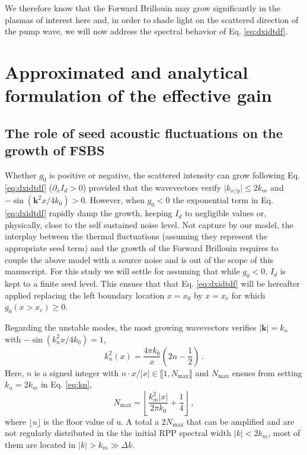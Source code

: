 \documentclass[
 reprint,
 amsmath,amssymb,
 aps,
]{revtex4-1}
\begin{document}
We therefore know that the Forward Brillouin may grow significantly in the plasmas  of interest here and, in order to shade light on the scattered  direction of the pump wave, we will now address the spectral behavior of Eq. \eqref{eq:dxidtdf}.

\section{Approximated and analytical formulation of the effective gain}
\subsection{The role of seed acoustic fluctuations on the growth of FSBS}
Whether $g_0$ is positive or negative,  the scattered intensity can grow following Eq. \eqref{eq:dxidtdf} ($\partial_x I_d>0$) provided that the wavevectors verify $\vert k_{x/y}\vert \le 2k_m$ and $-\sin( \mathbf{k}^2x/4k_0 ) >0$.
However, when $g_0<0$ the exponential term in Eq. \eqref{eq:dxidtdf} rapidly damp the growth, keeping $I_d$ to negligible values or, physically, close to the self sustained noise level.   
Not capture by our model, the interplay between the thermal fluctuations (assuming they represent the   appropriate seed term) and the growth of the Forward Brillouin  requires to couple the above model with a source noise  \cite[]{Yoon_2007,Ruyer_Gremillet_2013} and is out of the scope of this manuscript. 
For this study we will settle for assuming that while $g_0<0$, $I_d$ is kept to a finite seed level. This ensues that that Eq. \eqref{eq:dxidtdf} will be hereafter applied replacing the left boundary location  $x=x_0$ by $x=x_c$ for which $g_0(x>x_c)\ge 0$. 

Regarding the unstable modes, the most growing wavevectors verifies  $\vert \mathbf{k}\vert =k_n$ with  $-\sin(k_n^2x/4k_0 ) =1$,
\begin{equation}\label{eq:kn}
    k_n^2(x) =\frac{4\pi k_0}{x} \left(2n- \frac{1}{2}   \right) \, .
\end{equation}
Here, $n$ is a signed  integer with  $n \cdot x /\vert x\vert\in  \llbracket 1 ,N_\mathrm{max} \rrbracket$ and  $ N_\mathrm{max}$ ensues from setting  $k_n=2k_m$ in Eq. \eqref{eq:kn},
\begin{equation}\label{eq:nmax}
    N_\mathrm{max} =\left\lfloor  \frac{k_m^2\vert x\vert }{2\pi k_0} +\frac{1}{4}   \right\rfloor \,  ,
\end{equation}
where $\lfloor u  \rfloor$ is the floor value of u. 
A total a $2N_\mathrm{max}$ that can be  amplified and are not regularly distributed in the the initial RPP spectral width $\vert k \vert< 2k_m$, most of them are located in $\vert k \vert >k_m\gg \Delta k$. 
\end{document}
